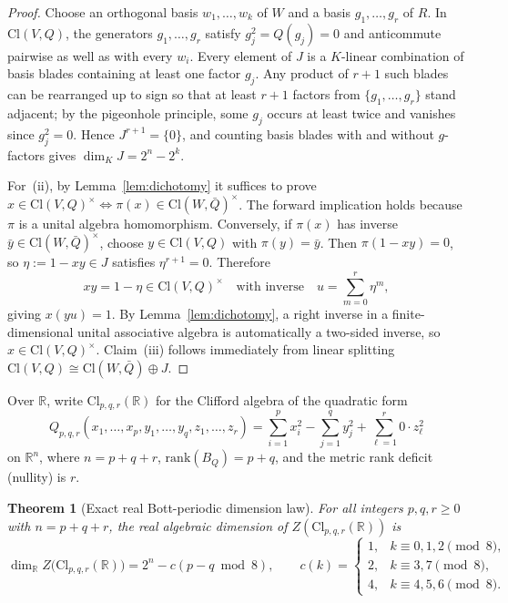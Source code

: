 \documentclass[11pt,a4paper]{article}
\newtheorem{theorem}{Theorem}[section]
\theoremstyle{definition}
\theoremstyle{remark}
\newcommand{\Cl}{\mathrm{Cl}}
\newcommand{\rank}{\mathrm{rank}}
\begin{document}
\begin{proof}
Choose an orthogonal basis $w_1, \dots, w_k$ of $W$ and a basis $g_1, \dots, g_r$ of $R$. In $\Cl(V, Q)$, the generators $g_1, \dots, g_r$ satisfy $g_j^2 = Q(g_j) = 0$ and anticommute pairwise as well as with every $w_i$. Every element of $J$ is a $K$-linear combination of basis blades containing at least one factor $g_j$. Any product of $r + 1$ such blades can be rearranged up to sign so that at least $r + 1$ factors from $\{g_1, \dots, g_r\}$ stand adjacent; by the pigeonhole principle, some $g_j$ occurs at least twice and vanishes since $g_j^2 = 0$. Hence $J^{r+1} = \{0\}$, and counting basis blades with and without $g$-factors gives $\dim_K J = 2^n - 2^k$.

For~(ii), by Lemma~\ref{lem:dichotomy} it suffices to prove $x \in \Cl(V, Q)^\times \iff \pi(x) \in \Cl(W, \bar{Q})^\times$. The forward implication holds because $\pi$ is a unital algebra homomorphism. Conversely, if $\pi(x)$ has inverse $\bar{y} \in \Cl(W, \bar{Q})^\times$, choose $y \in \Cl(V, Q)$ with $\pi(y) = \bar{y}$. Then $\pi(1 - xy) = 0$, so $\eta := 1 - xy \in J$ satisfies $\eta^{r+1} = 0$. Therefore
\[
xy = 1 - \eta \in \Cl(V, Q)^\times \quad\text{with inverse}\quad u = \sum_{m=0}^r \eta^m,
\]
giving $x(yu) = 1$. By Lemma~\ref{lem:dichotomy}, a right inverse in a finite-dimensional unital associative algebra is automatically a two-sided inverse, so $x \in \Cl(V, Q)^\times$. Claim~(iii) follows immediately from linear splitting $\Cl(V, Q) \cong \Cl(W, \bar{Q}) \oplus J$.
\end{proof}

Over $\mathbb{R}$, write $\Cl_{p,q,r}(\mathbb{R})$ for the Clifford algebra of the quadratic form
\[
Q_{p,q,r}(x_1,\dots,x_p, y_1,\dots,y_q, z_1,\dots,z_r) = \sum_{i=1}^p x_i^2 - \sum_{j=1}^q y_j^2 + \sum_{\ell=1}^r 0\cdot z_\ell^2
\]
on $\mathbb{R}^n$, where $n = p + q + r$, $\rank(B_Q) = p + q$, and the metric rank deficit (nullity) is $r$.

\begin{theorem}[Exact real Bott-periodic dimension law]\label{thm:real-law}
For all integers $p, q, r \ge 0$ with $n = p + q + r$, the real algebraic dimension of $Z(\Cl_{p,q,r}(\mathbb{R}))$ is
\begin{equation}\label{eq:bott-law}
\dim_{\mathbb{R}} Z\bigl(\Cl_{p,q,r}(\mathbb{R})\bigr) = 2^n - c(p - q \bmod 8), \qquad
c(k) = \begin{cases}
1, & k \equiv 0, 1, 2 \pmod 8,\\
2, & k \equiv 3, 7 \pmod 8,\\
4, & k \equiv 4, 5, 6 \pmod 8.
\end{cases}
\end{equation}
\end{theorem}
\end{document}
